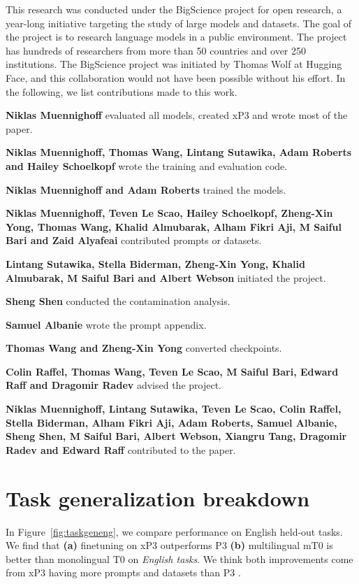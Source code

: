 \documentclass[11pt]{article}
\begin{document}
This research was conducted under the BigScience project for open research, a year-long initiative targeting the study of large models and datasets. The goal of the project is to research language models in a public environment. The project has hundreds of researchers from more than 50 countries and over 250 institutions. The BigScience project was initiated by Thomas Wolf at Hugging Face, and this collaboration would not have been possible without his effort. In the following, we list contributions made to this work. \\

{\setlength{\parindent}{0cm}
\textbf{Niklas Muennighoff} evaluated all models, created xP3 and wrote most of the paper.

\textbf{Niklas Muennighoff, Thomas Wang, Lintang Sutawika, Adam Roberts and Hailey Schoelkopf} wrote the training and evaluation code.

\textbf{Niklas Muennighoff and Adam Roberts} trained the models.

\textbf{Niklas Muennighoff, Teven Le Scao, Hailey Schoelkopf, Zheng-Xin Yong, Thomas Wang, Khalid Almubarak, Alham Fikri Aji, M Saiful Bari and Zaid Alyafeai} contributed prompts or datasets.

\textbf{Lintang Sutawika, Stella Biderman, Zheng-Xin Yong, Khalid Almubarak, M Saiful Bari and Albert Webson} initiated the project.

\textbf{Sheng Shen} conducted the contamination analysis.

\textbf{Samuel Albanie} wrote the prompt appendix.

\textbf{Thomas Wang and Zheng-Xin Yong} converted checkpoints.

\textbf{Colin Raffel, Thomas Wang, Teven Le Scao, M Saiful Bari, Edward Raff and Dragomir Radev} advised the project.

\textbf{Niklas Muennighoff, Lintang Sutawika, Teven Le Scao, Colin Raffel, Stella Biderman, Alham Fikri Aji, Adam Roberts, Samuel Albanie, Sheng Shen, M Saiful Bari, Albert Webson, Xiangru Tang, Dragomir Radev and Edward Raff} contributed to the paper.
} 
\FloatBarrier

\section{Task generalization breakdown}
\label{sec:taskgenlang}

In Figure~\ref{fig:taskgeneng}, we compare performance on English held-out tasks. We find that \textbf{(a)} finetuning on xP3 outperforms P3 \textbf{(b)} multilingual mT0 is better than monolingual T0 on \emph{English tasks}. We think both improvements come from xP3 having more prompts and datasets than P3 \cite{chung2022scaling}.
\end{document}
